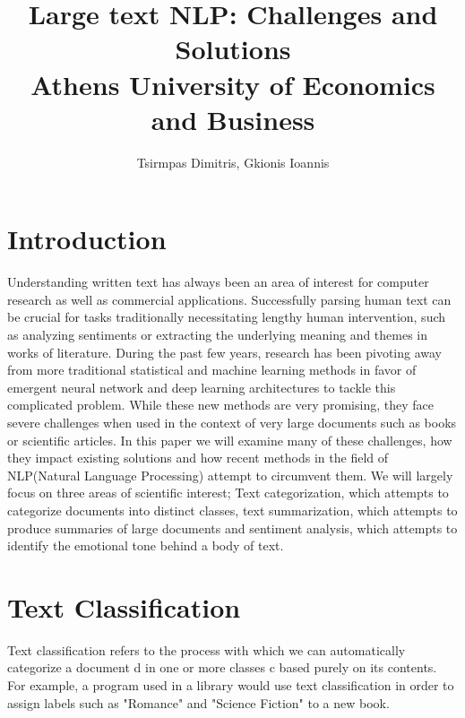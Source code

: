 \documentclass{article}
\title{Large text NLP: Challenges and Solutions\\\large Athens University of Economics and Business}
\author{Tsirmpas Dimitris, Gkionis Ioannis}
\begin{document}
	
	\begin{titlepage}
		\hypersetup{pageanchor=false} %
		\maketitle
	\end{titlepage}
	\hypersetup{pageanchor=true}
	
	\tableofcontents
	
	\section{Introduction}
	Understanding written text has always been an area of interest for computer research as well as commercial applications. Successfully parsing human text can be crucial for tasks traditionally necessitating lengthy human intervention, such as analyzing sentiments or extracting the underlying meaning and themes in works of literature. During the past few years, research has been pivoting away from more traditional statistical and machine learning methods in favor of emergent neural network and deep learning architectures to tackle this complicated problem. While these new methods are very promising, they face severe challenges when used in the context of very large documents such as books or scientific articles. In this paper we will examine many of these challenges, how they impact existing solutions and how recent methods in the field of NLP(Natural Language Processing) attempt to circumvent them. We will largely focus on three areas of scientific interest; Text categorization, which attempts to categorize documents into distinct classes, text summarization, which attempts to produce summaries of large documents and sentiment analysis, which attempts to identify the emotional tone behind a body of text. 
	
	
	\section{Text Classification}
	Text classification refers to the process with which we can automatically categorize a document d in one or more classes c based purely on its contents. For example, a program used in a library would use text classification in order to assign labels such as "Romance" and "Science Fiction" to a new book.\par
	
\end{document}
